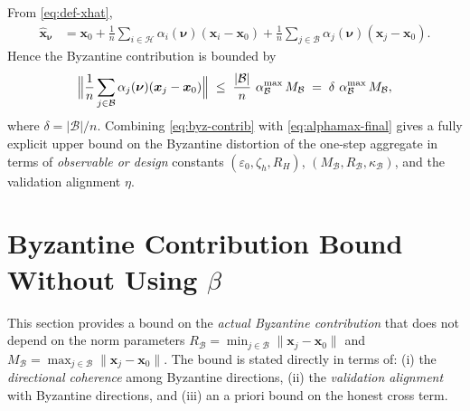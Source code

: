 \documentclass{article}
\theoremstyle{plain}
\theoremstyle{definition}
\theoremstyle{remark}
\begin{document}
From \eqref{eq:def-xhat},
\begin{align}
\hat {\bm{x}}_{\bm{\nu}}
&= \bm{x}_0 + \frac{1}{n}\sum_{i\in \mathcal{H}} \alpha_i(\bm{\nu})(\bm{x}_i-\bm{x}_0)
     + \frac{1}{n}\sum_{j\in \mathcal{B}} \alpha_j(\bm{\nu})(\bm{x}_j-\bm{x}_0).
\label{eq:xhat-split}
\end{align}
Hence the Byzantine contribution is bounded by
\begin{equation}
\Bigl\| \frac{1}{n}\sum_{j\in \mathcal{B}} \alpha_j(\bm{\nu})(\bm{x}_j-\bm{x}_0) \Bigr\|
\;\le\;
\frac{|\mathcal{B}|}{n}\ \alpha^{\max}_{\mathcal{B}}\, M_{\mathcal{B}}
\;=\;
\delta\ \alpha^{\max}_{\mathcal{B}}\, M_{\mathcal{B}},
\label{eq:byz-contrib}
\end{equation}
where $\delta=|\mathcal{B}|/n$.
Combining \eqref{eq:byz-contrib} with \eqref{eq:alphamax-final} gives a fully explicit upper bound on the Byzantine distortion of the one‑step aggregate in terms of \emph{observable or design} constants 
$(\varepsilon_0,\zeta_h,R_H)$,
$(M_{\mathcal{B}},R_{\mathcal{B}},\kappa_{\mathcal{B}})$,
and the validation alignment $\eta$.



\clearpage
\section{Byzantine Contribution Bound Without Using \texorpdfstring{$\beta$}{beta}}
\label{sec:byz-no-beta}

This section provides a bound on the \emph{actual Byzantine contribution} that
does not depend on the norm parameters
$R_{\mathcal{B}}=\min_{j\in\mathcal{B}}\|\bm{x}_j-\bm{x}_0\|$ and
$M_{\mathcal{B}}=\max_{j\in\mathcal{B}}\|\bm{x}_j-\bm{x}_0\|$.
The bound is stated directly in terms of: (i) the \emph{directional coherence}
among Byzantine directions, (ii) the \emph{validation alignment} with Byzantine
directions, and (iii) an a priori bound on the honest cross term.
\end{document}
